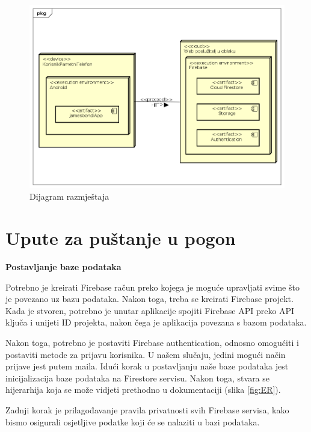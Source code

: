 			
			\begin{figure}[h]
				\includegraphics[scale=0.6]{dijagrami/Dijagram_razmjestaja.PNG}
				\centering
				\caption{Dijagram razmještaja}
				\label{fig:Dijagram_razmjestaja}
			\end{figure}
		
			
			\eject 
		
		\section{Upute za puštanje u pogon}
		
			\begin{flushleft}
				\textbf{Postavljanje baze podataka} 
			\end{flushleft}
			
			\text Potrebno je kreirati Firebase račun preko kojega je moguće upravljati svime što je povezano uz bazu podataka. Nakon toga, treba se kreirati Firebase projekt. Kada je stvoren, potrebno je unutar aplikacije spojiti Firebase API preko API ključa i unijeti ID projekta, nakon čega je aplikacija povezana s bazom podataka. 
			
			Nakon toga, potrebno je postaviti Firebase authentication, odnosno omogućiti i postaviti metode za prijavu korisnika. U našem slučaju, jedini mogući način prijave jest putem maila.
			Idući korak u postavljanju naše baze podataka jest inicijalizacija baze podataka na Firestore servisu. Nakon toga, stvara se hijerarhija koja se može vidjeti prethodno u dokumentaciji (slika \ref{fig:ER}).
			
			Zadnji korak je prilagođavanje pravila privatnosti svih Firebase servisa, kako bismo osigurali osjetljive podatke koji će se nalaziti u bazi podataka.
			

